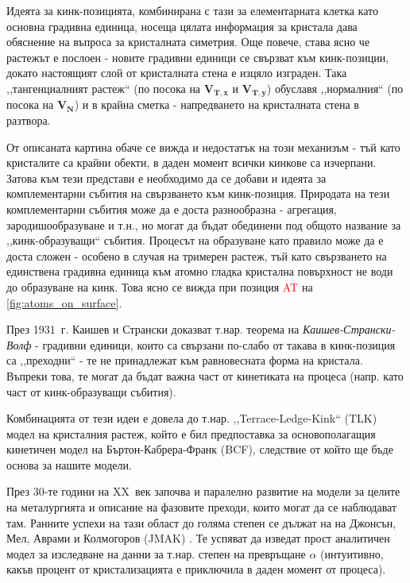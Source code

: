 Идеята за кинк-позицията, комбинирана с тази за елементарната клетка като основна градивна единица, носеща цялата информация за кристала дава обяснение на въпроса за кристалната симетрия. Още повече, става ясно че растежът е послоен - новите градивни единици се свързват към кинк-позиции, докато настоящият слой от кристалната стена е изцяло изграден. Така ,,тангенциалният растеж`` (по посока на  $\boldsymbol{V_{T,x}}$ и $\boldsymbol{V_{T,y}}$) обуславя ,,нормалния`` (по посока на $\boldsymbol{V_{N}}$) и в крайна сметка - напредването на кристалната стена в разтвора.

От описаната картина обаче се вижда и недостатък на този механизъм - тъй като кристалите са крайни обекти, в даден момент всички кинкове са изчерпани. Затова към тези представи е необходимо да се добави и идеята за комплементарни събития на свързването към кинк-позиция. Природата на тези комплементарни събития може да е доста разнообразна - агрегация, зародишообразуване и т.н., но могат да бъдат обединени под общото название за ,,кинк-образуващи`` събития.
Процесът на образуване като правило може да е доста сложен - особено в случая на тримерен растеж, тъй като свързването на единствена градивна единица към атомно гладка кристална повърхност не води до образуване на кинк. Това ясно се вижда при позиция \textcolor{red}{AT} на \autoref{fig:atoms_on_surface}.

През 1931~г. Каишев и Странски доказват т.нар. теорема на \textit{Каишев-Странски-Волф} - градивни единици, които са свързани по-слабо от такава в кинк-позиция са ,,преходни`` - те не принадлежат към равновесната форма на кристала. Въпреки това, те могат да бъдат важна част от кинетиката на процеса (напр. като част от кинк-образуващи събития). \cite{StranskiKaischew1931}\cite{Yamamoto1988}

Комбинацията от тези идеи е довела до т.нар. ,,Terrace-Ledge-Kink`` (TLK) модел на кристалния растеж, който е бил предпоставка за основополагащия кинетичен модел на Бъртон-Кабрера-Франк (BCF), следствие от който ще бъде основа за нашите модели. \cite{BCF1951}\cite{Chernov2004}

През 30-те години на XX~век започва и паралелно развитие на модели за целите на металургията и описание на фазовите преходи, които могат да се наблюдават там. Ранните успехи на тази област до голяма степен се дължат на на Джонсън, Мел, Аврами и Колмогоров (JMAK) \cite{Mehl1939} \cite{Lambrigger1998}. Те успяват да изведат прост аналитичен модел за изследване на данни за т.нар. степен на превръщане $\alpha$ (интуитивно, какъв процент от кристализацията е приключила в даден момент от процеса).

